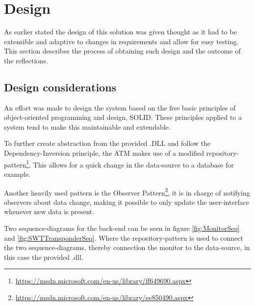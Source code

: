 \section{Design}
As earlier stated the design of this solution was given thought as it had to be extensible and adaptive to changes in requirements and allow for easy testing. This section describes the process of obtaining such design and the outcome of the reflections.

\subsection{Design considerations}
An effort was made to design the system based on the five basic principles of object-oriented programming and design, SOLID. These principles applied to a system tend to make this maintainable and extendable.

To further create abstraction from the provided .DLL and follow the Dependency-Inversion principle, the ATM makes use of a modified repository-pattern\footnote{\url{https://msdn.microsoft.com/en-us/library/ff649690.aspx}}. This allows for a quick change in the data-source to a database for example.

Another heavily used pattern is the Observer Pattern\footnote{\url{https://msdn.microsoft.com/en-us/library/ee850490.aspx}}, it is in charge of notifying observers about data change, making it possible to only update the user-interface whenever new data is present.

Two sequence-diagrams for the back-end can be seen in figure \ref{fig:MonitorSeq} and \ref{fig:SWTTransponderSeq}. Where the repository-pattern is used to connect the two sequence-diagrams, thereby connection the monitor to the data-source, in this case the provided .dll.

